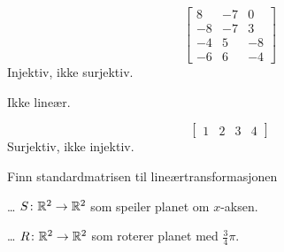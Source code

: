 \begin{losning}


\begin{punkt}
$$\begin{bmatrix}
8 & -7 & 0\\
-8 & -7 & 3\\
-4 & 5 & -8\\
-6 & 6 & -4
\end{bmatrix}$$
Injektiv, ikke surjektiv.
\end{punkt}

\begin{punkt}
Ikke lineær.
\end{punkt}

\begin{punkt}
$$\begin{bmatrix}
1 & 2 & 3 & 4
\end{bmatrix}$$
Surjektiv, ikke injektiv.
\end{punkt}




\end{losning}


\begin{oppgave}
Finn standardmatrisen til lineærtransformasjonen
\begin{punkt}
\ldots{} $S \colon \mathbb{R}^2 \to \mathbb{R}^2$ som
speiler planet om $x$-aksen.
\end{punkt}
\begin{punkt}
\ldots{} $R \colon \mathbb{R}^2 \to \mathbb{R}^2$ som
roterer planet med $\frac{3}{4}\pi$.
\end{punkt}
\end{oppgave}


